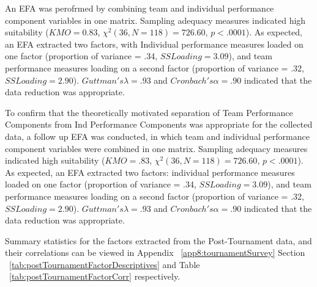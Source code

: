 {
An EFA was perofrmed by combining team and individual performance component variables in one matrix.  Sampling adequacy measures indicated high suitability ($KMO = 0.83$, $\chi^2(36, N = 118) = 726.60$, $p < .0001$).  As expected, an EFA extracted two factors, with Individual performance measures loaded on one factor (proportion of variance = .34, $SS Loading = 3.09$), and team performance measures loading on a second factor (proportion of variance = .32, $SS Loading = 2.90$). $Guttman's \lambda =.93$ and $Cronbach's \alpha = .90$ indicated that the data reduction was appropriate.


To confirm that the theoretically motivated separation of Team Performance Components from Ind Performance Components was appropriate for the collected data, a follow up EFA was conducted, in which team and individual performance component variables were combined in one matrix. Sampling adequacy measures indicated high suitability ($KMO = .83$, $\chi^2(36, N = 118) = 726.60$, $p < .0001$).  As expected, an EFA extracted two factors: individual performance measures loaded on one factor (proportion of variance = .34, $SS Loading = 3.09$), and team performance measures loading on a second factor (proportion of variance = .32, $SS Loading = 2.90$). $Guttman's \lambda =.93$ and $Cronbach's \alpha = .90$ indicated that the data reduction was appropriate.




Summary statistics for the factors extracted from the Post-Tournament data, and their correlations can be viewed in Appendix ~\ref{app8:tournamentSurvey} Section
 ~\ref{tab:postTournamentFactorDescriptives} and Table ~\ref{tab:postTournamentFactorCorr} respectively.



\newpage
{} %
\begin{landscape}






\clearpage




\clearpage





\end{landscape}}
